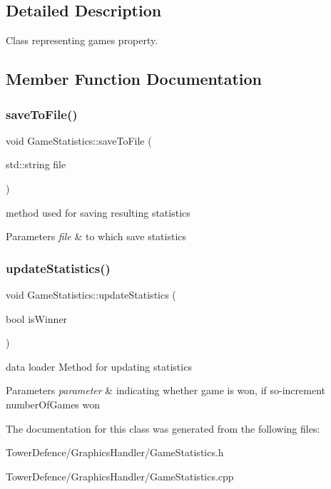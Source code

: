 \subsection{Detailed Description}
Class representing game\textquotesingle{}s property. 

\subsection{Member Function Documentation}
\mbox{\label{class_game_statistics_a74a4872e00ef08aa7f65a3a73a8c2ce0}} 
\subsubsection{\texorpdfstring{save\+To\+File()}{saveToFile()}}
{\footnotesize\ttfamily void Game\+Statistics\+::save\+To\+File (\begin{DoxyParamCaption}\item[{std\+::string}]{file }\end{DoxyParamCaption})}



method used for saving resulting statistics 


\begin{DoxyParams}{Parameters}
{\em file} & to which save statistics \\
\hline
\end{DoxyParams}
\mbox{\label{class_game_statistics_a9f1f6c74719aa14537bc973ad6db83cd}} 
\subsubsection{\texorpdfstring{update\+Statistics()}{updateStatistics()}}
{\footnotesize\ttfamily void Game\+Statistics\+::update\+Statistics (\begin{DoxyParamCaption}\item[{bool}]{is\+Winner }\end{DoxyParamCaption})}



data loader Method for updating statistics 


\begin{DoxyParams}{Parameters}
{\em parameter} & indicating whether game is won, if so-\/increment number\+Of\+Games won \\
\hline
\end{DoxyParams}


The documentation for this class was generated from the following files\+:\begin{DoxyCompactItemize}
\item 
Tower\+Defence/\+Graphics\+Handler/Game\+Statistics.\+h\item 
Tower\+Defence/\+Graphics\+Handler/Game\+Statistics.\+cpp\end{DoxyCompactItemize}
